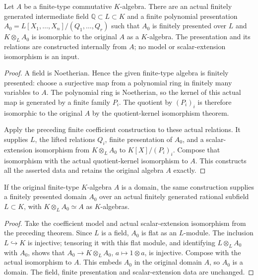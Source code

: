 \begin{theorem}
\label{hir:char-zero-finite-type-algebra-coefficient-model}
\leanok
{}
Let $A$ be a finite-type commutative $K$-algebra. There are an actual
finitely generated intermediate field $\mathbb Q\subset L\subset K$
and a finite polynomial presentation $A_0=L[X_1,\ldots,X_n]/(Q_1,
\ldots,Q_r)$ such that $A_0$ is finitely presented over $L$ and
$K\otimes_L A_0$ is isomorphic to the original $A$ as a $K$-algebra.
The presentation and its relations are constructed internally from
$A$; no model or scalar-extension isomorphism is an input.
\end{theorem}
\begin{proof}
A field is Noetherian. Hence the given finite-type algebra is finitely
presented: choose a surjective map from a polynomial ring in finitely
many variables to $A$. The polynomial ring is Noetherian, so the
kernel of this actual map is generated by a finite family $P_i$.
The quotient by $(P_i)_i$ is therefore isomorphic to the original
$A$ by the quotient-kernel isomorphism theorem.

Apply the preceding finite coefficient construction to these actual
relations. It supplies $L$, the lifted relations $Q_i$, finite
presentation of $A_0$, and a scalar-extension isomorphism from
$K\otimes_L A_0$ to $K[X]/(P_i)_i$. Compose that isomorphism with
the actual quotient-kernel isomorphism to $A$. This constructs all
the asserted data and retains the original algebra $A$ exactly.
\end{proof}

\begin{theorem}
\label{hir:char-zero-finite-type-domain-coefficient-model}
\leanok
{}
If the original finite-type $K$-algebra $A$ is a domain, the same
construction supplies a finitely presented domain $A_0$ over an
actual finitely generated rational subfield $L\subset K$, with
$K\otimes_L A_0\simeq A$ as $K$-algebras.
\end{theorem}
\begin{proof}
Take the coefficient model and actual scalar-extension isomorphism
from the preceding theorem. Since $L$ is a field, $A_0$ is flat as
an $L$-module. The inclusion $L\hookrightarrow K$ is injective;
tensoring it with this flat module, and identifying
$L\otimes_L A_0$ with $A_0$, shows that
$A_0\to K\otimes_L A_0$, $a\mapsto1\otimes a$, is injective.
Compose with the actual isomorphism to $A$. This embeds $A_0$ in
the original domain $A$, so $A_0$ is a domain. The field, finite
presentation and scalar-extension data are unchanged.
\end{proof}
